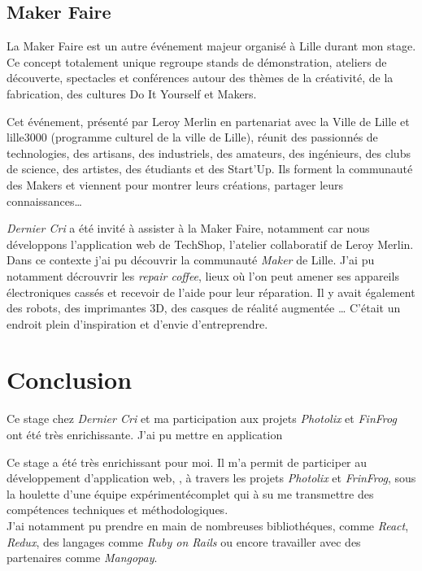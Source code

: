\documentclass[12pt,a4paper]{article}
\begin{document}
  \bigskip

  \subsection{Maker Faire}\label{maker-faire}

  \bigskip

  La Maker Faire est un autre événement majeur organisé à Lille durant mon
  stage. Ce concept totalement unique regroupe stands de démonstration,
  ateliers de découverte, spectacles et conférences autour des thèmes de
  la créativité, de la fabrication, des cultures Do It Yourself et Makers.

  \bigskip

  Cet événement, présenté par Leroy Merlin en partenariat avec la Ville de
  Lille et lille3000 (programme culturel de la ville de Lille), réunit des
  passionnés de technologies, des artisans, des industriels, des amateurs,
  des ingénieurs, des clubs de science, des artistes, des étudiants et des
  Start'Up. Ils forment la communauté des Makers et viennent pour montrer
  leurs créations, partager leurs connaissances\ldots{}

  \bigskip

  \emph{Dernier Cri} a été invité à assister à la Maker Faire, notamment
  car nous développons l'application web de TechShop, l'atelier
  collaboratif de Leroy Merlin. Dans ce contexte j'ai pu découvrir la
  communauté \emph{Maker} de Lille. J'ai pu notamment décrouvrir les
  \emph{repair coffee}, lieux où l'on peut amener ses appareils
  électroniques cassés et recevoir de l'aide pour leur réparation. Il y
  avait également des robots, des imprimantes 3D, des casques de réalité
  augmentée \ldots{} C'était un endroit plein d'inspiration et d'envie
  d'entreprendre.

  \newpage

  \section{Conclusion}\label{conclusion-2}

  Ce stage chez \emph{Dernier Cri} et ma participation aux projets
  \emph{Photolix} et \emph{FinFrog} ont été très enrichissante. J'ai pu
  mettre en application

  \bigskip

  Ce stage a été très enrichissant pour moi. Il m'a permit de participer
  au développement d'application web, , à travers les projets
  \emph{Photolix} et \emph{FrinFrog}, sous la houlette d'une équipe
  expérimentécomplet qui à su me transmettre des compétences techniques et
  méthodologiques.\\
  J'ai notamment pu prendre en main de nombreuses bibliothéques, comme
  \emph{React}, \emph{Redux}, des langages comme \emph{Ruby on Rails} ou
  encore travailler avec des partenaires comme \emph{Mangopay}.
\end{document}
